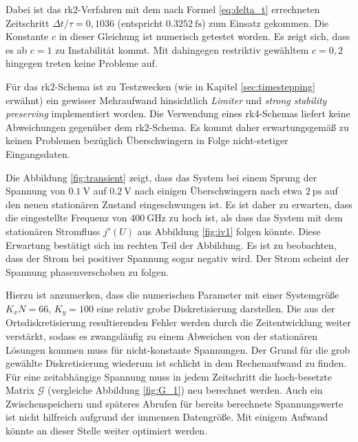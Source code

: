 Dabei ist das \ac{rk}2-Verfahren mit dem nach Formel \eqref{eq:delta_t} errechneten Zeitschritt ${\Delta t / \tau = 0,1036}$ (entspricht $\SI{0.3252}{\femto\second}$) zum Einsatz gekommen. Die Konstante $c$ in dieser Gleichung ist numerisch getestet worden. Es zeigt sich, dass es ab $c=1$ zu Instabilität kommt. Mit dahingegen restriktiv gewähltem $c=0,2$ hingegen treten keine Probleme auf.

Für das \ac{rk}2-Schema ist zu Testzwecken (wie in Kapitel \ref{sec:timestepping} erwähnt) ein gewisser Mehraufwand hinsichtlich \emph{Limiter} und \emph{strong stability preserving} implementiert worden. Die Verwendung eines \ac{rk}4-Schemas liefert keine Abweichungen gegenüber dem \ac{rk}2-Schema. Es kommt daher erwartungsgemäß zu keinen Problemen bezüglich Überschwingern in Folge nicht-stetiger Eingangsdaten.

Die Abbildung \ref{fig:transient} zeigt, dass das System bei einem Sprung der Spannung von $\SI{0.1}{\volt}$ auf $\SI{0.2}{\volt}$ nach einigen Überschwingern nach etwa $\SI{2}{\pico\second}$ auf den neuen stationären Zustand eingeschwungen ist. Es ist daher zu erwarten, dass die eingestellte Frequenz von $\SI{400}{\giga\hertz}$ zu hoch ist, als dass das System mit dem stationären Stromfluss $j^s(U)$ aus Abbildung \ref{fig:iv1} folgen könnte. Diese Erwartung bestätigt sich im rechten Teil der Abbildung. Es ist zu beobachten, dass der Strom bei positiver Spannung sogar negativ wird. Der Strom scheint der Spannung phasenverschoben zu folgen.

Hierzu ist anzumerken, dass die numerischen Parameter mit einer Systemgröße $K_xN=66$, $K_y=100$ eine relativ grobe Diskretisierung darstellen. Die aus der Ortsdiskretisierung resultierenden Fehler werden durch die Zeitentwicklung weiter verstärkt, sodass es zwangsläufig zu einem Abweichen von der stationären Lösungen kommen muss für nicht-konstante Spannungen. Der Grund für die grob gewählte Diskretisierung wiederum ist schlicht in dem Rechenaufwand zu finden. Für eine zeitabhängige Spannung muss in jedem Zeitschritt die hoch-besetzte Matrix $\mathcal{G}$ (vergleiche Abbildung \ref{fig:G_1}) neu berechnet werden. Auch ein Zwischenspeichern und späteres Abrufen für bereits berechnete Spannungswerte ist nicht hilfreich aufgrund der immensen Datengröße. Mit einigem Aufwand könnte an dieser Stelle weiter optimiert werden.
